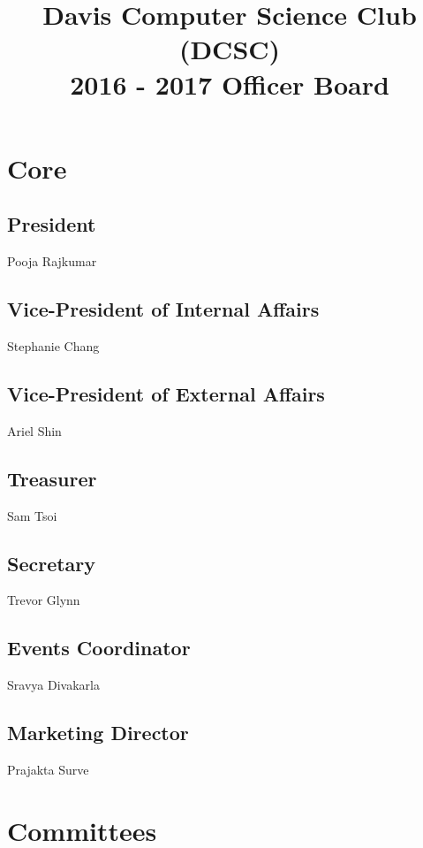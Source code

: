 \documentclass[10pt]{article}
\title{Davis Computer Science Club (DCSC)\\2016 - 2017 Officer Board}
\date{}
\author{}
\begin{document}
\maketitle

\section{Core}

\subsection{President}

Pooja Rajkumar

\subsection{Vice-President of Internal Affairs}

Stephanie Chang

\subsection{Vice-President of External Affairs}

Ariel Shin

\subsection{Treasurer}

Sam Tsoi

\subsection{Secretary}

Trevor Glynn

\subsection{Events Coordinator}

Sravya Divakarla

\subsection{Marketing Director}

Prajakta Surve

\section{Committees}
\end{document}
